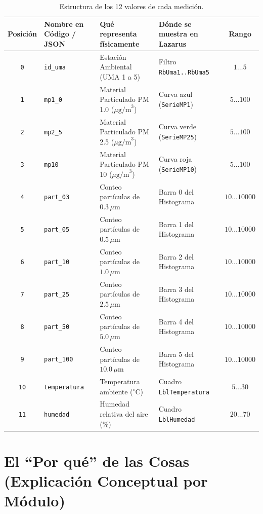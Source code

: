 \documentclass[11pt,a4paper]{article}
\begin{document}
\begin{table}[h!]
\centering
\small
\begin{tabular}{@{}clllc@{}}
\toprule
\textbf{Posición} & \textbf{Nombre en Código / JSON} & \textbf{Qué representa físicamente} & \textbf{Dónde se muestra en Lazarus} & \textbf{Rango} \\ \midrule
\texttt{0} & \texttt{id\_uma} & Estación Ambiental (UMA 1 a 5) & Filtro \texttt{RbUma1..RbUma5} & $1 \dots 5$ \\
\texttt{1} & \texttt{mp1\_0} & Material Particulado PM 1.0 ($\mu\text{g/m}^3$) & Curva azul (\texttt{SerieMP1}) & $5 \dots 100$ \\
\texttt{2} & \texttt{mp2\_5} & Material Particulado PM 2.5 ($\mu\text{g/m}^3$) & Curva verde (\texttt{SerieMP25}) & $5 \dots 100$ \\
\texttt{3} & \texttt{mp10} & Material Particulado PM 10 ($\mu\text{g/m}^3$) & Curva roja (\texttt{SerieMP10}) & $5 \dots 100$ \\
\texttt{4} & \texttt{part\_03} & Conteo partículas de $0.3\,\mu\text{m}$ & Barra 0 del Histograma & $10 \dots 10000$ \\
\texttt{5} & \texttt{part\_05} & Conteo partículas de $0.5\,\mu\text{m}$ & Barra 1 del Histograma & $10 \dots 10000$ \\
\texttt{6} & \texttt{part\_10} & Conteo partículas de $1.0\,\mu\text{m}$ & Barra 2 del Histograma & $10 \dots 10000$ \\
\texttt{7} & \texttt{part\_25} & Conteo partículas de $2.5\,\mu\text{m}$ & Barra 3 del Histograma & $10 \dots 10000$ \\
\texttt{8} & \texttt{part\_50} & Conteo partículas de $5.0\,\mu\text{m}$ & Barra 4 del Histograma & $10 \dots 10000$ \\
\texttt{9} & \texttt{part\_100} & Conteo partículas de $10.0\,\mu\text{m}$ & Barra 5 del Histograma & $10 \dots 10000$ \\
\texttt{10} & \texttt{temperatura} & Temperatura ambiente ($^\circ\text{C}$) & Cuadro \texttt{LblTemperatura} & $5 \dots 30$ \\
\texttt{11} & \texttt{humedad} & Humedad relativa del aire ($\%$) & Cuadro \texttt{LblHumedad} & $20 \dots 70$ \\ \bottomrule
\end{tabular}
\caption{Estructura de los 12 valores de cada medición.}
\end{table}

\section{El ``Por qué'' de las Cosas (Explicación Conceptual por Módulo)}
\end{document}
